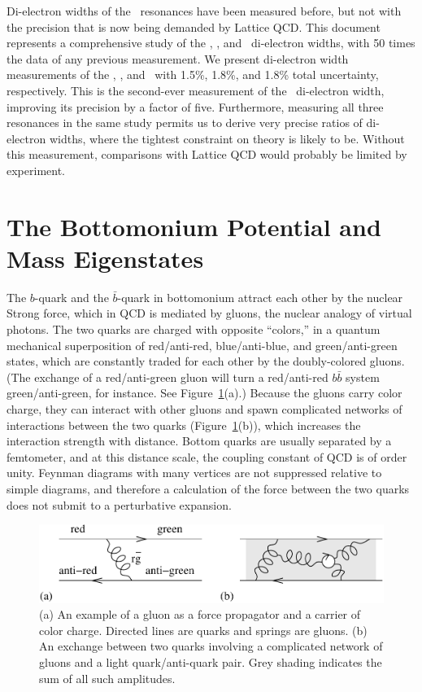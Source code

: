 \documentclass{cornell}
\begin{document}
Di-electron widths of the \ups\ resonances have been measured before,
but not with the precision that is now being demanded by Lattice QCD.
This document represents a comprehensive study of the \us, \uss, and
\usss\ di-electron widths, with 50 times the data of any previous
measurement.  We present di-electron width measurements of the \us,
\uss, and \usss\ with 1.5\%, 1.8\%, and 1.8\% total uncertainty,
respectively.  This is the second-ever measurement of the \usss\
di-electron width, improving its precision by a factor of five.
Furthermore, measuring all three resonances in the same study permits
us to derive very precise ratios of di-electron widths, where the
tightest constraint on theory is likely to be.  Without this
measurement, comparisons with Lattice QCD would probably be limited by
experiment.

\section{The Bottomonium Potential and Mass Eigenstates}

The $b$-quark and the $\bar{b}$-quark in bottomonium attract each
other by the nuclear Strong force, which in QCD is mediated by gluons,
the nuclear analogy of virtual photons.  The two quarks are charged
with opposite ``colors,'' in a quantum mechanical superposition of
red/anti-red, blue/anti-blue, and green/anti-green states, which are
constantly traded for each other by the doubly-colored gluons.  (The
exchange of a red/anti-green gluon will turn a red/anti-red $b\bar{b}$
system green/anti-green, for instance.  See Figure~\ref{gluejunk}(a).)
Because the gluons carry color charge, they can interact with other
gluons and spawn complicated networks of interactions between the two
quarks (Figure~\ref{gluejunk}(b)), which increases the interaction
strength with distance.  Bottom quarks are usually separated by a
femtometer, and at this distance scale, the coupling constant of QCD
is of order unity.  Feynman diagrams with many vertices are not
suppressed relative to simple diagrams, and therefore a calculation of
the force between the two quarks does not submit to a perturbative
expansion.

\begin{figure}[p]
  \begin{center}
    \includegraphics[width=\linewidth]{plots/gluejunk}
  \end{center}
  \caption[Color exchange and the complexity of QCD]{\label{gluejunk} (a)
  An example of a gluon as a force propagator and a carrier of color
  charge.  Directed lines are quarks and springs are gluons.  (b) An
  exchange between two quarks involving a complicated network of
  gluons and a light quark/anti-quark pair.  Grey shading indicates
  the sum of all such amplitudes.}
\end{figure}
\end{document}

